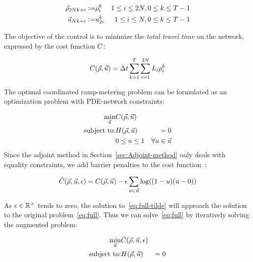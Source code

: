 							\begin{eqnarray*}
								\vec{\rho}_{2Nk+i}:= & \rho_{i}^{k} & 1\le i\le2N,0\le k\le T-1\\
								\vec{u}_{Nk+i}:= & u_{2i}^{k} & 1\le i\le N,0\le k\le T-1
							\end{eqnarray*}
							
							
							The objective of the control is to minimize the \emph{total travel
								time }on the network, expressed by the cost function $C$:
							
							\[
								\cost\left(\state,\control\right)=\Delta t\sum_{k=1}^{T}\sum_{i=1}^{2\nlinks}L_{i}\densitydiscrete{\link}{\tind}
							\]
							
							
							The optimal coordinated ramp-metering problem can be formulated as
							an optimization problem with PDE-network constraints:
							
							\begin{eqnarray}
								\min_{\control} & \cost\left(\state,\control\right)\label{eq:full}\\
								\text{subject to:} & \sys\left(\state,\control\right) & =0\nonumber \\
								& 0\le\convar\le1 & \forall\convar\in\control\nonumber 
							\end{eqnarray}
							Since the adjoint method in Section~\ref{sec:Adjoint-method} only
							deals with equality constraints, we add barrier penalties to the cost
							function~\cite{Boyd2010,Bayen2006}:
							
							\begin{equation}
								\tilde{\cost}\left(\state,\control,\epsilon\right)=\cost\left(\state,\control\right)-\barrierTerm\sum_{\convar\in\control}\log\left(\left(1-\convar\right)\left(\convar-0\right)\right)\label{eq:full-tilde}
							\end{equation}
							
							
							As $\epsilon\in\mathbb{R}^{+}$ tends to zero, the solution to~\eqref{eq:full-tilde}
							will approach the solution to the original problem~\eqref{eq:full}.
							Thus we can solve~\eqref{eq:full} by iteratively solving the augmented
							problem:
							
							\begin{eqnarray}
								\min_{\control} & \tilde{\cost}\left(\state,\control,\epsilon\right)\label{eq:full-1}\\
								\text{subject to:} & \sys\left(\state,\control\right) & =0\nonumber 
							\end{eqnarray}
							
